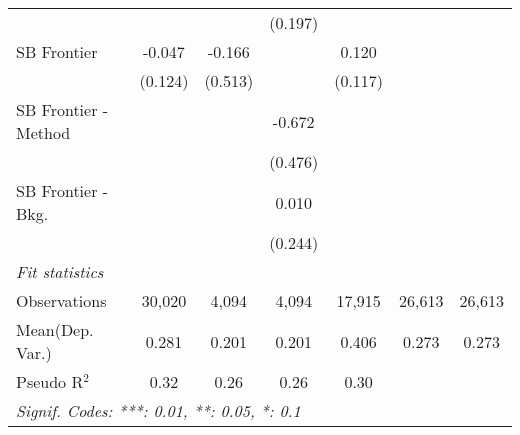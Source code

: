 \begin{tabular}{lcccccc}
                        &               &              & (0.197)      &               &        &   \\   
   SB Frontier          & -0.047        & -0.166       &              & 0.120         &        &   \\   
                        & (0.124)       & (0.513)      &              & (0.117)       &        &   \\   
   SB Frontier - Method &               &              & -0.672       &               &        &   \\   
                        &               &              & (0.476)      &               &        &   \\   
   SB Frontier - Bkg.   &               &              & 0.010        &               &        &   \\   
                        &               &              & (0.244)      &               &        &   \\   
   \midrule
   \emph{Fit statistics}\\
   Observations         & 30,020        & 4,094        & 4,094        & 17,915        & 26,613 & 26,613\\  
Mean(Dep. Var.) & 0.281 & 0.201 & 0.201 & 0.406 & 0.273 & 0.273 \\
   Pseudo R$^2$         & 0.32          & 0.26         & 0.26         & 0.30          &        & \\  
   \midrule \midrule
   \multicolumn{7}{l}{\emph{Signif. Codes: ***: 0.01, **: 0.05, *: 0.1}}\\
\end{tabular}
\par\endgroup
